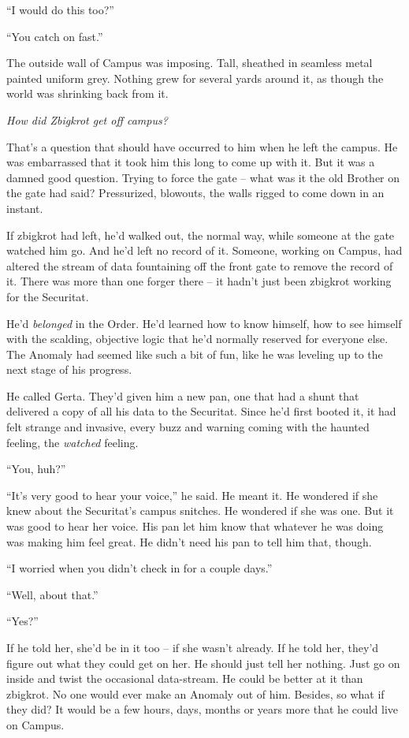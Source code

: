 “I would do this too?”

“You catch on fast.”

\tb

The outside wall of Campus was imposing. Tall, sheathed in seamless 
metal painted uniform grey. Nothing grew for several yards around it, 
as though the world was shrinking back from it.

\emph{How did Zbigkrot get off campus?}

That's a question that should have occurred to him when he left the 
campus. He was embarrassed that it took him this long to come up with 
it. But it was a damned good question. Trying to force the gate -- what 
was it the old Brother on the gate had said? Pressurized, blowouts, the 
walls rigged to come down in an instant.

If zbigkrot had left, he'd walked out, the normal way, while someone at 
the gate watched him go. And he'd left no record of it. Someone, 
working on Campus, had altered the stream of data fountaining off the 
front gate to remove the record of it. There was more than one forger 
there -- it hadn't just been zbigkrot working for the Securitat.

He'd \emph{belonged} in the Order. He'd learned how to know himself, 
how to see himself with the scalding, objective logic that he'd 
normally reserved for everyone else. The Anomaly had seemed like such a 
bit of fun, like he was leveling up to the next stage of his progress.

He called Gerta. They'd given him a new pan, one that had a shunt that 
delivered a copy of all his data to the Securitat. Since he'd first 
booted it, it had felt strange and invasive, every buzz and warning 
coming with the haunted feeling, the \emph{watched} feeling.

“You, huh?”

“It's very good to hear your voice,” he said. He meant it. He 
wondered if she knew about the Securitat's campus snitches. He wondered 
if she was one. But it was good to hear her voice. His pan let him know 
that whatever he was doing was making him feel great. He didn't need 
his pan to tell him that, though.

“I worried when you didn't check in for a couple days.”

“Well, about that.”

“Yes?”

If he told her, she'd be in it too -- if she wasn't already. If he told 
her, they'd figure out what they could get on her. He should just tell 
her nothing. Just go on inside and twist the occasional data-stream. He 
could be better at it than zbigkrot. No one would ever make an Anomaly 
out of him. Besides, so what if they did? It would be a few hours, 
days, months or years more that he could live on Campus.

